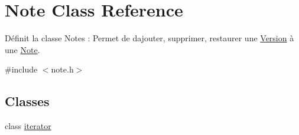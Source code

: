 \hypertarget{class_note}{}\section{Note Class Reference}
\label{class_note}


Définit la classe Notes \+: Permet de d\textquotesingle{}ajouter, supprimer, restaurer une \hyperlink{class_version}{Version} à une \hyperlink{class_note}{Note}.  




{\ttfamily \#include $<$note.\+h$>$}

\subsection*{Classes}
\begin{DoxyCompactItemize}
\item 
class \hyperlink{class_note_1_1iterator}{iterator}
\end{DoxyCompactItemize}
